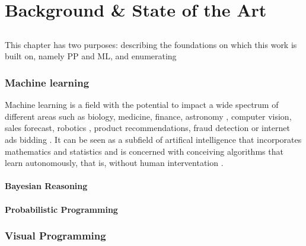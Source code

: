 \chapter{Background & State of the Art} \label{chap:sota}

\section*{}

This chapter has two purposes: describing the foundations on which this work
is built on, namely PP and ML, and enumerating

\iffalse
Neste capítulo é descrito o estado da arte e são
apresentados trabalhos relacionados para mostrar o que existe no
mesmo domínio e quais os problemas em aberto.
Deve deixar claro que existe uma oportunidade de desenvolvimento que
cobre alguma falha concreta .

O capítulo deve também efetuar uma revisão tecnológica às principais
ferramentas utilizáveis no âmbito do projeto, justificando futuras
escolhas.
\fi

\subsection{Machine learning}

Machine learning is a field with the potential to impact a wide spectrum of
different areas such as biology, medicine, finance, astronomy
\cite{Amatriain:2013:BDU:2541176.2514691}, computer vision, sales forecast,
robotics \cite{intml}, product recommendations, fraud detection or
internet ads bidding \cite{SciPy}. It can be seen as a subfield of artifical
intelligence that incorporates mathematics and statistics and is concerned
with conceiving algorithms that learn autonomously, that is, without human
interventation \cite{mlbrit}\cite{mlnot}.

\subsubsection{Bayesian Reasoning}

\subsubsection{Probabilistic Programming}

\subsection{Visual Programming}

